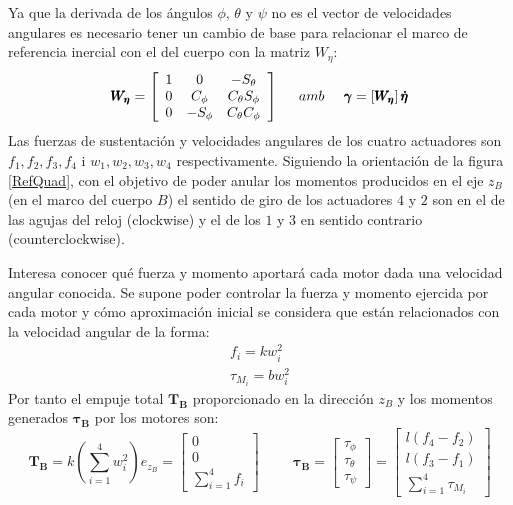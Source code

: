 \documentclass[twoside,11pt]{report}
\begin{document}
Ya que la derivada de los ángulos $\phi$, $\theta$ y $\psi$ no es el vector de velocidades angulares es necesario tener un cambio de base para relacionar el marco de referencia inercial con el del cuerpo con la matriz $W_\eta$:
\begin{equation}
\pmb{W_\eta}=\left[\begin{array}{ccc}
1 & 0 & -S_\theta \\
0 & C_\phi & C_\theta S_\phi \\
0 & -S_\phi & C_\theta C_\phi 
\end{array} \right] \hspace{0.5cm} amb \hspace{0.5cm} 
\pmb{\gamma}=\left[ \pmb{W_\eta} \right] \pmb{\dot{\eta}} 
\end{equation}
Las fuerzas de sustentación y velocidades angulares de los cuatro actuadores son $f_1,f_2,f_3,f_4$ i $w_1,w_2,w_3,w_4$ respectivamente. Siguiendo la orientación de la figura \ref{RefQuad}, con el objetivo de poder anular los momentos producidos en el eje $z_B$ (en el marco del cuerpo $B$) el sentido de giro de los actuadores  $4$ y $2$ son en el de las agujas del reloj (clockwise) y el de los $1$ y $3$ en sentido contrario (counterclockwise).

Interesa conocer qué fuerza y momento aportará cada motor dada una velocidad angular conocida. Se supone poder controlar la fuerza y momento ejercida por cada motor y cómo aproximación inicial se considera que están relacionados con la velocidad angular de la forma:
\begin{equation}
\begin{array}{l}
f_i=kw^2_i \\ 
\tau_{M_i}=bw^2_i
\end{array}
\end{equation}
Por tanto el empuje total $\pmb{T_B}$ proporcionado en la dirección $z_B$ y los momentos generados $\pmb{\tau_B}$ por los motores son:
\begin{equation}
\pmb{T_B}=k\left(\sum_{i=1}^{4}w^2_i \right)e_{z_B}=\left[ \begin{array}{c}
0 \\
0 \\
\displaystyle\sum_{i=1}^{4}f_i
\end{array} \right] 
\hspace{1cm} \pmb{\tau_B}=\left[ \begin{array}{c}
\tau_\phi \\
\tau_\theta \\
\tau_\psi
\end{array} \right] = \left[ \begin{array}{c}
l(f_4 - f_2) \\
l(f_3 - f_1) \\
\displaystyle\sum_{i=1}^{4}\tau_{M_i}
\end{array} \right]
\end{equation}
\end{document}
